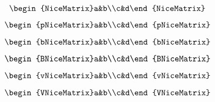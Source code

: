\documentclass{article}
\begin{document}
\[\begin{NiceMatrix}a&b\\c&d\end{NiceMatrix}\]
\[\begin{pNiceMatrix}a&b\\c&d\end{pNiceMatrix}\]
\[\begin{bNiceMatrix}a&b\\c&d\end{bNiceMatrix}\]
\[\begin{BNiceMatrix}a&b\\c&d\end{BNiceMatrix}\]
\[\begin{vNiceMatrix}a&b\\c&d\end{vNiceMatrix}\]
\[\begin{VNiceMatrix}a&b\\c&d\end{VNiceMatrix}\]
\end{document}
